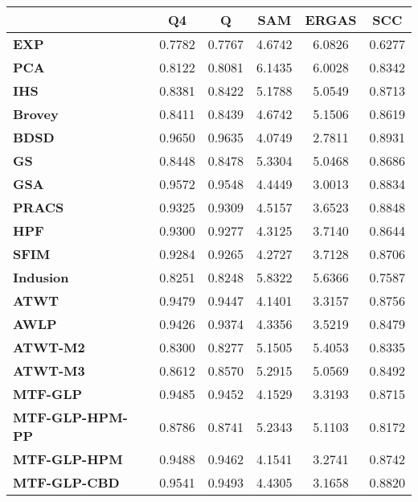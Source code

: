 \begin{tabular}{|l|c|c|c|c|c|}
\hline
&\textbf{Q4}&\textbf{Q}&\textbf{SAM}&\textbf{ERGAS}&\textbf{SCC}\\\hline
\textbf{EXP}&0.7782&0.7767&4.6742&6.0826&0.6277\\\hline
\textbf{PCA}&0.8122&0.8081&6.1435&6.0028&0.8342\\\hline
\textbf{IHS}&0.8381&0.8422&5.1788&5.0549&0.8713\\\hline
\textbf{Brovey}&0.8411&0.8439&4.6742&5.1506&0.8619\\\hline
\textbf{BDSD}&0.9650&0.9635&4.0749&2.7811&0.8931\\\hline
\textbf{GS}&0.8448&0.8478&5.3304&5.0468&0.8686\\\hline
\textbf{GSA}&0.9572&0.9548&4.4449&3.0013&0.8834\\\hline
\textbf{PRACS}&0.9325&0.9309&4.5157&3.6523&0.8848\\\hline
\textbf{HPF}&0.9300&0.9277&4.3125&3.7140&0.8644\\\hline
\textbf{SFIM}&0.9284&0.9265&4.2727&3.7128&0.8706\\\hline
\textbf{Indusion}&0.8251&0.8248&5.8322&5.6366&0.7587\\\hline
\textbf{ATWT}&0.9479&0.9447&4.1401&3.3157&0.8756\\\hline
\textbf{AWLP}&0.9426&0.9374&4.3356&3.5219&0.8479\\\hline
\textbf{ATWT-M2}&0.8300&0.8277&5.1505&5.4053&0.8335\\\hline
\textbf{ATWT-M3}&0.8612&0.8570&5.2915&5.0569&0.8492\\\hline
\textbf{MTF-GLP}&0.9485&0.9452&4.1529&3.3193&0.8715\\\hline
\textbf{MTF-GLP-HPM-PP}&0.8786&0.8741&5.2343&5.1103&0.8172\\\hline
\textbf{MTF-GLP-HPM}&0.9488&0.9462&4.1541&3.2741&0.8742\\\hline
\textbf{MTF-GLP-CBD}&0.9541&0.9493&4.4305&3.1658&0.8820\\\hline
\end{tabular}

